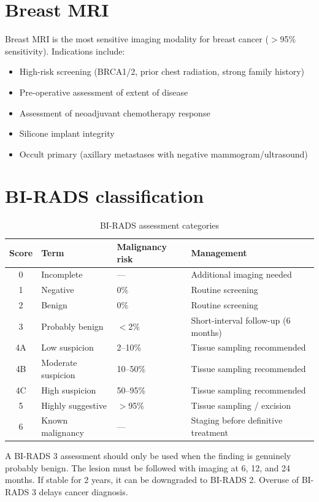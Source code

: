 \section{Breast MRI}
Breast MRI is the most sensitive imaging modality for breast cancer ($>$95\% sensitivity). Indications include:
\begin{itemize}
    \item High-risk screening (BRCA1/2, prior chest radiation, strong family history)
    \item Pre-operative assessment of extent of disease
    \item Assessment of neoadjuvant chemotherapy response
    \item Silicone implant integrity
    \item Occult primary (axillary metastases with negative mammogram/ultrasound)
\end{itemize}

\section{BI-RADS classification}

\begin{table}[h]
\centering
\caption{BI-RADS assessment categories}
\label{tab:birads}
\begin{tabular}{clll}
\hline
\textbf{Score} & \textbf{Term} & \textbf{Malignancy risk} & \textbf{Management} \\
\hline
0 & Incomplete & --- & Additional imaging needed \\
1 & Negative & 0\% & Routine screening \\
2 & Benign & 0\% & Routine screening \\
3 & Probably benign & $<$2\% & Short-interval follow-up (6 months) \\
4A & Low suspicion & 2--10\% & Tissue sampling recommended \\
4B & Moderate suspicion & 10--50\% & Tissue sampling recommended \\
4C & High suspicion & 50--95\% & Tissue sampling recommended \\
5 & Highly suggestive & $>$95\% & Tissue sampling / excision \\
6 & Known malignancy & --- & Staging before definitive treatment \\
\hline
\end{tabular}
\end{table}

\begin{pearlbox}
A BI-RADS 3 assessment should only be used when the finding is genuinely probably benign. The lesion must be followed with imaging at 6, 12, and 24 months. If stable for 2 years, it can be downgraded to BI-RADS 2. Overuse of BI-RADS 3 delays cancer diagnosis.
\end{pearlbox}

